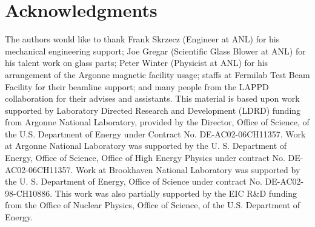 \section{Acknowledgments}
The authors would like to thank Frank Skrzecz (Engineer at ANL) for his mechanical engineering support; Joe Gregar (Scientific Glass Blower at ANL) for his talent work on glass parts; Peter Winter (Physicist at ANL) for his arrangement of the Argonne magnetic facility usage; staffs at Fermilab Test Beam Facility for their beamline support; and many people from the LAPPD collaboration for their advises and assistants. This material is based upon work supported by Laboratory Directed Research and Development (LDRD) funding from Argonne National Laboratory, provided by the Director, Office of Science, of the U.S. Department of Energy under Contract No. DE-AC02-06CH11357. Work at Argonne National Laboratory was supported by the U. S. Department of Energy, Office of Science, Office of High Energy Physics under contract No. DE-AC02-06CH11357. Work at Brookhaven National Laboratory was supported by the U. S. Department of Energy, Office of Science under contract No. DE-AC02-98-CH10886. This work was also partially supported by the EIC R{\&}D funding from the Office of Nuclear Physics, Office of Science, of the U.S. Department of Energy.
